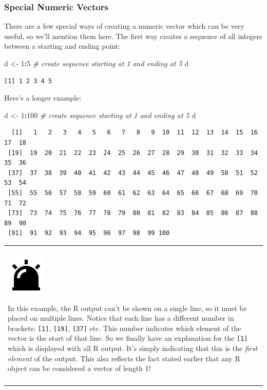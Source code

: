 \documentclass[
]{book}
\newenvironment{Shaded}{\begin{snugshade}}{\end{snugshade}}
\newcommand{\CommentTok}[1]{\textcolor[rgb]{0.56,0.35,0.01}{\textit{#1}}}
\newcommand{\DecValTok}[1]{\textcolor[rgb]{0.00,0.00,0.81}{#1}}
\newcommand{\NormalTok}[1]{#1}
\newcommand{\OperatorTok}[1]{\textcolor[rgb]{0.81,0.36,0.00}{\textbf{#1}}}
\newcommand{\StringTok}[1]{\textcolor[rgb]{0.31,0.60,0.02}{#1}}
\newenvironment{caution}
{
  \begin{center}
  \begin{tabular}{|>{\columncolor{caution}}p{0.9\textwidth}|}
  \hline\\
  \includegraphics[scale=0.1]{src/images/alarm-warning-fill.png}
}
{\\\\\hline
  \end{tabular}
  \end{center}
}
\begin{document}
\hypertarget{special-numeric-vectors}{%
\subsubsection{Special Numeric Vectors}\label{special-numeric-vectors}}

There are a few special ways of creating a numeric vector which can be very useful, so we'll mention them here.
The first way creates a sequence of all integers between a starting and ending point:

\begin{Shaded}
\begin{Highlighting}[]
\NormalTok{d <-}\StringTok{ }\DecValTok{1}\OperatorTok{:}\DecValTok{5}  \CommentTok{# create sequence starting at 1 and ending at 5}
\NormalTok{d}
\end{Highlighting}
\end{Shaded}

\begin{verbatim}
[1] 1 2 3 4 5
\end{verbatim}

Here's a longer example:

\begin{Shaded}
\begin{Highlighting}[]
\NormalTok{d <-}\StringTok{ }\DecValTok{1}\OperatorTok{:}\DecValTok{100}  \CommentTok{# create sequence starting at 1 and ending at 5}
\NormalTok{d}
\end{Highlighting}
\end{Shaded}

\begin{verbatim}
  [1]   1   2   3   4   5   6   7   8   9  10  11  12  13  14  15  16  17  18
 [19]  19  20  21  22  23  24  25  26  27  28  29  30  31  32  33  34  35  36
 [37]  37  38  39  40  41  42  43  44  45  46  47  48  49  50  51  52  53  54
 [55]  55  56  57  58  59  60  61  62  63  64  65  66  67  68  69  70  71  72
 [73]  73  74  75  76  77  78  79  80  81  82  83  84  85  86  87  88  89  90
 [91]  91  92  93  94  95  96  97  98  99 100
\end{verbatim}

\begin{caution}
In this example, the R output can't be shown on a single line, so it
must be placed on multiple lines. Notice that each line has a different
number in brackets: \texttt{{[}1{]}}, \texttt{{[}19{]}},
\texttt{{[}37{]}} etc. This number indicates which element of the vector
is the start of that line. So we finally have an explanation for the
\texttt{{[}1{]}} which is displayed with all R output. It's simply
indicating that this is the \emph{first element} of the output. This
also reflects the fact stated earlier that any R object can be
considered a vector of length 1!
\end{caution}
\end{document}
